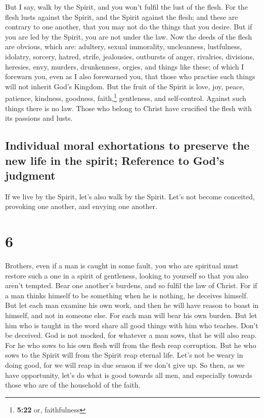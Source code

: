 But I say, walk by the Spirit, and you won't fulfil the
lust of the flesh.  For the flesh lusts against the
Spirit, and the Spirit against the flesh; and these are contrary to one
another, that you may not do the things that you desire. 
But if you are led by the Spirit, you are not under the law.
 Now the deeds of the flesh are obvious, which are:
adultery, sexual immorality, uncleanness, lustfulness, 
idolatry, sorcery, hatred, strife, jealousies, outbursts of anger,
rivalries, divisions, heresies,  envy, murders,
drunkenness, orgies, and things like these; of which I forewarn you,
even as I also forewarned you, that those who practise such things will
not inherit God's Kingdom.  But the fruit of the Spirit
is love, joy, peace, patience, kindness, goodness, faith,\footnote{\textbf{5:22}
  or, faithfulness}  gentleness, and self-control.
Against such things there is no law.  Those who belong to
Christ have crucified the flesh with its passions and lusts.

\hypertarget{individual-moral-exhortations-to-preserve-the-new-life-in-the-spirit-reference-to-gods-judgment}{%
\subsection{Individual moral exhortations to preserve the new life in
the spirit; Reference to God's
judgment}\label{individual-moral-exhortations-to-preserve-the-new-life-in-the-spirit-reference-to-gods-judgment}}

 If we live by the Spirit, let's also walk by the Spirit.
 Let's not become conceited, provoking one another, and
envying one another.

\hypertarget{section-5}{%
\section{6}\label{section-5}}

 Brothers, even if a man is caught in some fault, you who
are spiritual must restore such a one in a spirit of gentleness, looking
to yourself so that you also aren't tempted.  Bear one
another's burdens, and so fulfil the law of Christ.  For
if a man thinks himself to be something when he is nothing, he deceives
himself.  But let each man examine his own work, and then
he will have reason to boast in himself, and not in someone else.
 For each man will bear his own burden.  But
let him who is taught in the word share all good things with him who
teaches.  Don't be deceived. God is not mocked, for
whatever a man sows, that he will also reap.  For he who
sows to his own flesh will from the flesh reap corruption. But he who
sows to the Spirit will from the Spirit reap eternal life.
 Let's not be weary in doing good, for we will reap in due
season if we don't give up.  So then, as we have
opportunity, let's do what is good towards all men, and especially
towards those who are of the household of the faith.

